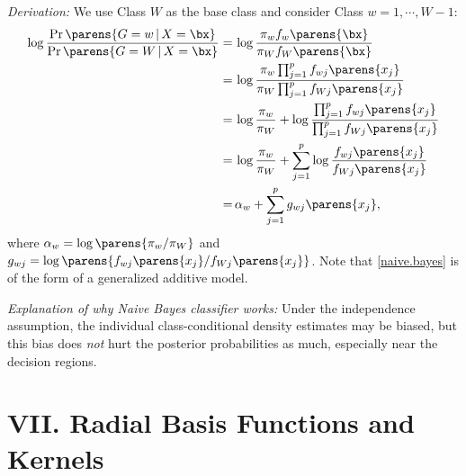 \documentclass[12pt]{article}
\begin{document}
\begin{enumerate}[label=\textbf{\arabic*.}]
	\textit{Derivation:} We use Class $W$ as the base class and consider Class $w = 1, \cdots, W-1$: 
	\begin{align}
		\log \frac{\Pr \parens{G = w \,\vert\, X = \bx}}{\Pr \parens{G = W \,\vert\, X = \bx}} = & \, \log \frac{\pi_w f_w \parens{\bx}}{\pi_W f_W \parens{\bx}} \nonumber \\
		= & \, \log \frac{\pi_w \prod_{j=1}^p f_{wj} \parens{x_j}}{\pi_W \prod_{j=1}^p f_{Wj} \parens{x_j}} \nonumber \\
		= & \, \log \frac{\pi_w}{\pi_W} + \log \frac{\prod_{j=1}^p f_{wj} \parens{x_j}}{\prod_{j=1}^p f_{Wj} \parens{x_j}} \nonumber \\
		= & \, \log \frac{\pi_w}{\pi_W} + \sum_{j=1}^p \log \frac{f_{wj} \parens{x_j}}{f_{Wj} \parens{x_j}} \nonumber \\
		= & \, \alpha_w + \sum_{j=1}^p g_{wj} \parens{x_j}, \label{naive.bayes}
	\end{align}
	where $\alpha_w = \log \parens{\pi_w / \pi_W}$ and $g_{wj} = \log \parens{f_{wj} \parens{x_j} / f_{Wj} \parens{x_j}}$. Note that \eqref{naive.bayes} is of the form of a generalized additive model. 
	
	\textit{Explanation of why Naive Bayes classifier works:} Under the independence assumption, the individual class-conditional density estimates may be biased, but this bias does \emph{not} hurt the posterior probabilities as much, especially near the decision regions. 
\end{enumerate}

\section*{VII. Radial Basis Functions and Kernels}
\end{document}

